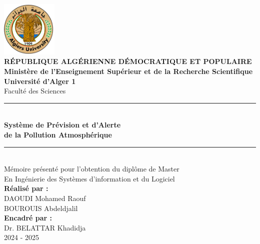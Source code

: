 \documentclass[12pt,a4paper]{report}
\begin{document}
\begin{titlepage}
\begin{center}
    \includegraphics[width=0.2\textwidth]{logo_universite.png}\\[1cm]
    
    {\Large \textbf{RÉPUBLIQUE ALGÉRIENNE DÉMOCRATIQUE ET POPULAIRE}}\\[0.5cm]
    {\large \textbf{Ministère de l'Enseignement Supérieur et de la Recherche Scientifique}}\\[0.5cm]
    {\large \textbf{Université d'Alger 1}}\\
    {\large Faculté des Sciences}\\[0.5cm]

    \rule{\linewidth}{0.5mm} \\[0.4cm]
    {\Huge \textbf{Système de Prévision et d’Alerte\\ de la Pollution Atmosphérique}}\\[0.4cm]
    \rule{\linewidth}{0.5mm} \\[1cm]
    
    {\large Mémoire présenté pour l’obtention du diplôme de Master}\\
    {\large En Ingénierie des Systèmes d’information et du Logiciel}\\[1cm]

    \textbf{Réalisé par :}\\
    {\large DAOUDI Mohamed Raouf\\
    BOUROUIS Abdeldjalil}\\[1cm]

    \textbf{Encadré par :}\\
    {\large Dr. BELATTAR Khadidja}\\[1cm]
    
    {\large 2024 - 2025}
\end{center}
\end{titlepage}

\newpage
\thispagestyle{empty}
\mbox{}
\end{document}
